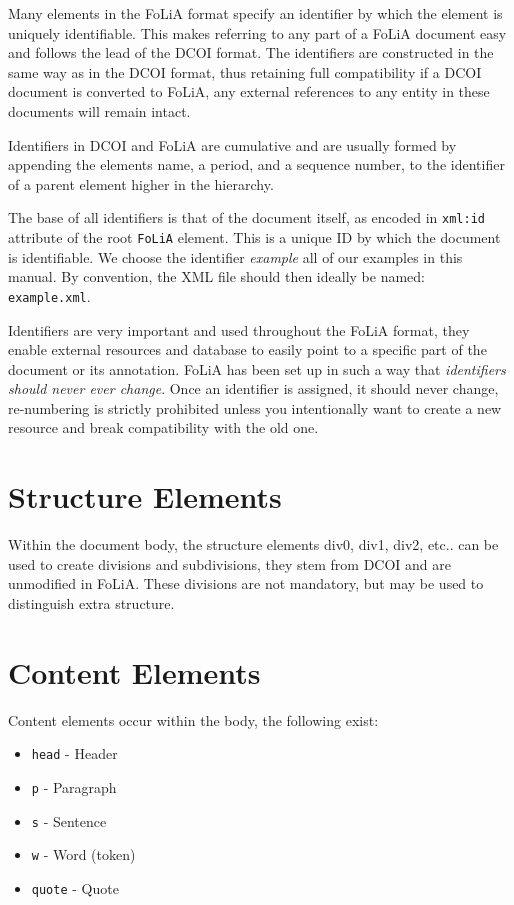 \documentclass[a4paper,12pt]{report}
\begin{document}
Many elements in the FoLiA format specify an identifier by which the element is uniquely identifiable. This makes referring to any part of a FoLiA document easy and follows the lead of the DCOI format. The identifiers are constructed in the same way as in the DCOI format, thus retaining full compatibility if a DCOI document is converted to FoLiA, any external references to any entity in these documents will remain intact.

Identifiers in DCOI and FoLiA are cumulative and are usually formed by appending the elements name, a period, and a sequence number, to the identifier of a parent element higher in the hierarchy.

The base of all identifiers is that of the document itself, as encoded in \texttt{xml:id} attribute of the root \texttt{FoLiA} element. This is a unique ID by which the document is identifiable. We choose the identifier \emph{example} all of our examples in this manual. By convention, the XML file should then ideally be named: \texttt{example.xml}.

Identifiers are very important and used throughout the FoLiA format, they enable external resources and database to easily point to a specific part of the document or its annotation. FoLiA has been set up in such a way that \emph{identifiers should never ever change}. Once an identifier is assigned, it should never change, re-numbering is strictly prohibited unless you intentionally want to create a new resource and break compatibility with the old one.


\section{Structure Elements}

Within the document body, the structure elements div0, div1, div2, etc.. can be used to create divisions and subdivisions, they stem from DCOI and are unmodified in FoLiA. These divisions are not mandatory, but may be used to distinguish extra structure.

\section{Content Elements}

Content elements occur within the body, the following exist:

\begin{itemize}
\item \texttt{head} - Header
\item \texttt{p} - Paragraph
\item \texttt{s} - Sentence
\item \texttt{w} - Word (token)
\item \texttt{quote} - Quote
\end{itemize}
\end{document}
